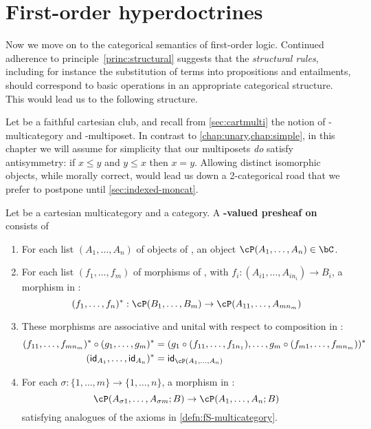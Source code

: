 \section{First-order hyperdoctrines}
\label{sec:hyperdoctrines}

Now we move on to the categorical semantics of first-order logic.
Continued adherence to principle~\eqref{princ:structural} suggests that the \emph{structural rules}, including for instance the substitution of terms into propositions and entailments, should correspond to basic operations in an appropriate categorical structure.
This would lead us to the following structure.

Let \fS be a faithful cartesian club, and recall from \cref{sec:cartmulti} the notion of \fS-multicategory and \fS-multiposet.
In contrast to \cref{chap:unary,chap:simple}, in this chapter we will assume for simplicity that our multiposets \emph{do} satisfy antisymmetry: if $x\le y$ and $y\le x$ then $x=y$.
Allowing distinct isomorphic objects, while morally correct, would lead us down a 2-categorical road that we prefer to postpone until \cref{sec:indexed-moncat}.

\begin{defn}
  Let \cS be a cartesian multicategory and \bC a category.
  A \textbf{\bC-valued presheaf on \cS} consists of
  \begin{enumerate}
  \item For each list $(A_1,\dots,A_n)$ of objects of \cS, an object $\cP(A_1,\dots,A_n)\in\bC$.
  \item For each list $(f_1,\dots,f_m)$ of morphisms of \cS, with $f_i:(A_{i1},\dots,A_{in_i})\to B_i$, a morphism in \bC:
    \[ (f_1,\dots,f_n)^* : \cP(B_1,\dots,B_m) \to \cP(A_{11},\dots,A_{mn_m}) \]
  \item These morphisms are associative and unital with respect to composition in \cS:
    \begin{align*}
      (f_{11},\dots,f_{mn_m})^* \circ (g_1,\dots,g_m)^* &=
      (g_1\circ (f_{11},\dots,f_{1n_1}), \dots, g_m \circ (f_{m1},\dots,f_{mn_m}))^*
      \\
      (\idfunc_{A_1},\dots,\idfunc_{A_n})^* &= \idfunc_{\cP(A_1,\dots,A_n)}
    \end{align*}
  \item For each $\sigma : \{1,\dots,m\} \to \{1,\dots,n\}$, a morphism in \bC:
    \[ \cP(A_{\sigma 1},\dots,A_{\sigma m}; B) \to \cP(A_1,\dots,A_n;B) \]
    satisfying analogues of the axioms in \cref{defn:fS-multicategory}.
  \end{enumerate}
\end{defn}

